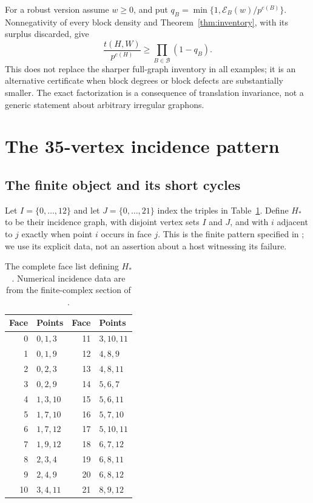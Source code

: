 \documentclass[11pt]{article}
\numberwithin{equation}{section}
\theoremstyle{definition}
\theoremstyle{remark}
\newcommand{\Err}{\mathcal E}
\newcommand{\Hstar}{H_{\!*}}
\begin{document}
For a robust version assume $w\geq0$, and put
$q_B=\min\{1,\Err_B(w)/p^{e(B)}\}$. Nonnegativity of every block density
and Theorem~\ref{thm:inventory}, with its surplus discarded, give
\begin{equation}
 \frac{t(H,W)}{p^{e(H)}}\geq\prod_{B\in\mathcal B}(1-q_B).
 \label{eq:robust-block}
\end{equation}
This does not replace the sharper full-graph inventory in all examples;
it is an alternative certificate when block degrees or block defects
are substantially smaller. The exact factorization is a consequence
of translation invariance, not a generic statement about arbitrary
irregular graphons.

\section{The 35-vertex incidence pattern}
\label{sec:incidence}

\subsection{The finite object and its short cycles}

Let $I=\{0,\ldots,12\}$ and let $J=\{0,\ldots,21\}$ index the triples
in Table~\ref{tab:faces}. Define $\Hstar$ to be their incidence graph,
with disjoint vertex sets $I$ and $J$, and with $i$ adjacent to $j$ exactly
when point $i$ occurs in face $j$. This is the finite pattern specified
in \cite{OpenAIComplex}; we use its explicit data, not an assertion about
a host witnessing its failure.

\begin{table}[htbp]
\centering
\begin{tabular}{r@{\quad}l@{\qquad\qquad}r@{\quad}l}
\toprule
Face & Points & Face & Points\\
\midrule
0 & $0,1,3$ & 11 & $3,10,11$\\
1 & $0,1,9$ & 12 & $4,8,9$\\
2 & $0,2,3$ & 13 & $4,8,11$\\
3 & $0,2,9$ & 14 & $5,6,7$\\
4 & $1,3,10$ & 15 & $5,6,11$\\
5 & $1,7,10$ & 16 & $5,7,10$\\
6 & $1,7,12$ & 17 & $5,10,11$\\
7 & $1,9,12$ & 18 & $6,7,12$\\
8 & $2,3,4$ & 19 & $6,8,11$\\
9 & $2,4,9$ & 20 & $6,8,12$\\
10 & $3,4,11$ & 21 & $8,9,12$\\
\bottomrule
\end{tabular}
\caption{The complete face list defining $\Hstar$. Numerical incidence
data are from the finite-complex section of \cite{OpenAIComplex}.}
\label{tab:faces}
\end{table}
\end{document}
